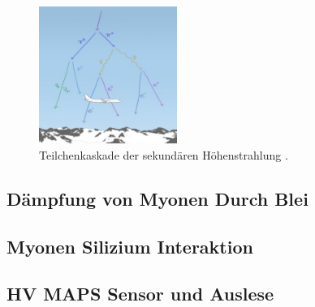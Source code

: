 \begin{figure}[H]
    \centering
    \includegraphics[width=0.4\textwidth]{images:/strahlung.png}
    \caption{ Teilchenkaskade der sekundären Höhenstrahlung   \cite{höhenstrahlung}.}
    \label{höhen:pic}
\end{figure}



\subsection{Dämpfung von Myonen Durch Blei}



\subsection{Myonen Silizium Interaktion}



\subsection{HV MAPS Sensor und Auslese}